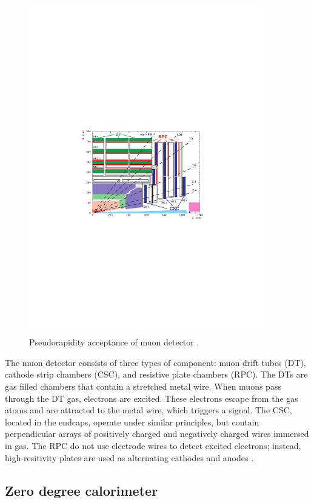 \begin{figure}[]
\begin{centering}
\includegraphics[width=4in]{Chapter3/importfigs/Figure_001-006.pdf}
\par\end{centering}
\caption{Pseudorapidity acceptance of muon detector \cite{Bayatian:2006nff}. \label{fig:muonYZ}}
\end{figure}

The muon detector consists of three types of component: muon drift tubes (DT), cathode strip chambers (CSC), and resistive plate chambers (RPC). The DTs are gas filled chambers that contain a stretched metal wire. When muons pass through the DT gas, electrons are excited. These electrons escape from the gas atoms and are attracted to the metal wire, which triggers a signal. The CSC, located in the endcaps, operate under similar principles, but contain perpendicular arrays of positively charged and negatively charged wires immersed in gas. The RPC do not use electrode wires to detect excited electrons; instead, high-resitivity plates are used as alternating cathodes and anodes \cite{Albajar:2005wv}.

\subsection{Zero degree calorimeter}


